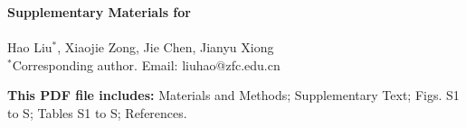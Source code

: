 
\setcounter{figure}{0}
\setcounter{table}{0}

\begin{center}
{\Large\bfseries Supplementary Materials for}\\[6pt]
{\large\bfseries \papertitle}\\[8pt]
{\normalsize Hao Liu$^{*}$, Xiaojie Zong, Jie Chen, Jianyu Xiong}\\[4pt]
{\small $^{*}$Corresponding author. Email: liuhao@zfc.edu.cn}
\end{center}
\vspace{6pt}
\noindent\textbf{This PDF file includes:} Materials and Methods; Supplementary Text; Figs. S1 to S\smFigCount; Tables S1 to S\smTabCount; References.
\vspace{6pt}


\clearpage

\clearpage

\clearpage


